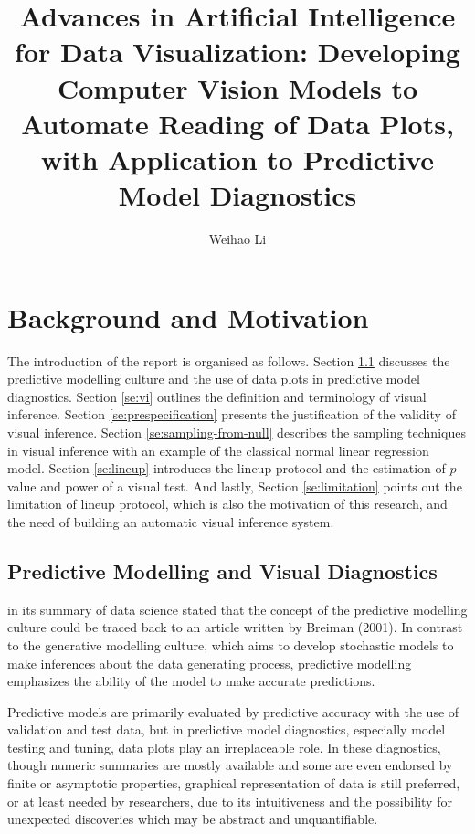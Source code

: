 \documentclass{monashthesis}
\author{Weihao Li}
\title{Advances in Artificial Intelligence for Data Visualization: Developing Computer Vision Models to Automate Reading of Data Plots, with Application to Predictive Model Diagnostics}
\theoremstyle{definition}
\theoremstyle{definition}
\theoremstyle{definition}
\theoremstyle{definition}
\theoremstyle{remark}
\begin{document}

\titlepage

{\sf\tighttoc\doublespacing}

\clearpage{}\setcounter{page}{0}

\hypertarget{background-and-motivation}{%
\chapter{Background and Motivation}\label{background-and-motivation}}

The introduction of the report is organised as follows. Section \ref{se:predictive-modelling} discusses the predictive modelling culture and the use of data plots in predictive model diagnostics. Section \ref{se:vi} outlines the definition and terminology of visual inference. Section \ref{se:prespecification} presents the justification of the validity of visual inference. Section \ref{se:sampling-from-null} describes the sampling techniques in visual inference with an example of the classical normal linear regression model. Section \ref{se:lineup} introduces the lineup protocol and the estimation of \(p\)-value and power of a visual test. And lastly, Section \ref{se:limitation} points out the limitation of lineup protocol, which is also the motivation of this research, and the need of building an automatic visual inference system.

\hypertarget{se:predictive-modelling}{%
\section{Predictive Modelling and Visual Diagnostics}\label{se:predictive-modelling}}

\textcite{donoho_50_2017} in its summary of data science stated that the concept of the predictive modelling culture could be traced back to an article written by Breiman (2001). In contrast to the generative modelling culture, which aims to develop stochastic models to make inferences about the data generating process, predictive modelling emphasizes the ability of the model to make accurate predictions.

Predictive models are primarily evaluated by predictive accuracy with the use of validation and test data, but in predictive model diagnostics, especially model testing and tuning, data plots play an irreplaceable role. In these diagnostics, though numeric summaries are mostly available and some are even endorsed by finite or asymptotic properties, graphical representation of data is still preferred, or at least needed by researchers, due to its intuitiveness and the possibility for unexpected discoveries which may be abstract and unquantifiable.
\end{document}
